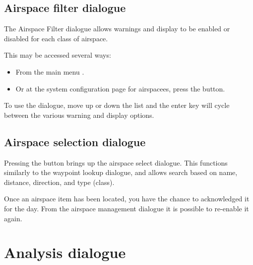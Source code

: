 

\subsection*{Airspace filter dialogue}\label{sec:airspace-filter}

The Airspace Filter dialogue allows warnings and display to be enabled
or disabled for each class of airspace.

This may be accessed several ways:
\begin{itemize}
\item From the main menu \blink{}.
\item Or at the system configuration page for airspacees, press the  button.
\end{itemize}

To use the dialogue, move up or down the list and the enter key will
cycle between the various warning and display options.

\subsection*{Airspace selection dialogue}

Pressing the  button brings up the airspace select dialogue.
This functions similarly to the waypoint lookup dialogue, and allows
search based on name, distance, direction, and type (class).

Once an airspace item has been located, you have the chance to acknowledged it
for the day.  From the
airspace management dialogue it is possible to re-enable it again.

\section{Analysis dialogue}

